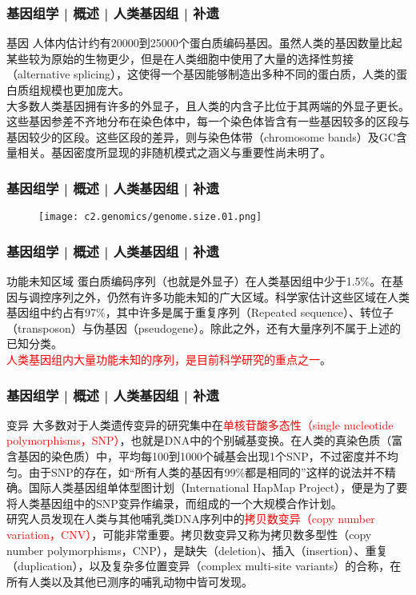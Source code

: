 \begin{frame}
  \frametitle{基因组学 | 概述 | 人类基因组 | 补遗}
  \begin{block}{基因}
人体内估计约有20000到25000个蛋白质编码基因。虽然人类的基因数量比起某些较为原始的生物更少，但是在人类细胞中使用了大量的选择性剪接（alternative splicing），这使得一个基因能够制造出多种不同的蛋白质，人类的蛋白质组规模也更加庞大。\\
\vspace{1em}
大多数人类基因拥有许多的外显子，且人类的内含子比位于其两端的外显子更长。这些基因参差不齐地分布在染色体中，每一个染色体皆含有一些基因较多的区段与基因较少的区段。这些区段的差异，则与染色体带（chromosome bands）及GC含量相关。基因密度所显现的非随机模式之涵义与重要性尚未明了。
  \end{block}
\end{frame}

\begin{frame}
  \frametitle{基因组学 | 概述 | 人类基因组 | 补遗}
  \begin{figure}
    \centering
    \texttt{[image: c2.genomics/genome.size.01.png]}
  \end{figure}
\end{frame}

\begin{frame}
  \frametitle{基因组学 | 概述 | 人类基因组 | 补遗}
  \begin{block}{功能未知区域}
蛋白质编码序列（也就是外显子）在人类基因组中少于1.5\%。在基因与调控序列之外，仍然有许多功能未知的广大区域。科学家估计这些区域在人类基因组中约占有97\%，其中许多是属于重复序列（Repeated sequence）、转位子（transposon）与伪基因（pseudogene）。除此之外，还有大量序列不属于上述的已知分类。\\
\vspace{1em}
\textcolor{red}{人类基因组内大量功能未知的序列，是目前科学研究的重点之一}。
  \end{block}
\end{frame}

\begin{frame}
  \frametitle{基因组学 | 概述 | 人类基因组 | 补遗}
  \begin{block}{变异}
    大多数对于人类遗传变异的研究集中在\textcolor{red}{单核苷酸多态性（single nucleotide polymorphisms，SNP）}，也就是DNA中的个别碱基变换。在人类的真染色质（富含基因的染色质）中，平均每100到1000个碱基会出现1个SNP，不过密度并不均匀。由于SNP的存在，如“所有人类的基因有99\%都是相同的”这样的说法并不精确。国际人类基因组单体型图计划（International HapMap Project），便是为了要将人类基因组中的SNP变异作编录，而组成的一个大规模合作计划。\\
\vspace{1em}
研究人员发现在人类与其他哺乳类DNA序列中的\textcolor{red}{拷贝数变异（copy number variation，CNV）}，可能非常重要。拷贝数变异又称为拷贝数多型性（copy number polymorphisms，CNP），是缺失（deletion)、插入（insertion）、重复（duplication），以及复杂多位置变异（complex multi-site variants）的合称，在所有人类以及其他已测序的哺乳动物中皆可发现。
  \end{block}
\end{frame}

